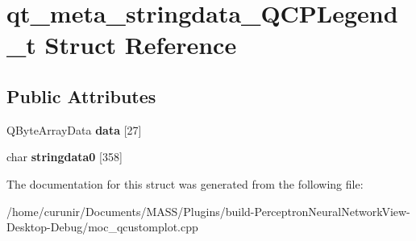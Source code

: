 \hypertarget{structqt__meta__stringdata___q_c_p_legend__t}{}\section{qt\+\_\+meta\+\_\+stringdata\+\_\+\+Q\+C\+P\+Legend\+\_\+t Struct Reference}
\label{structqt__meta__stringdata___q_c_p_legend__t}
\subsection*{Public Attributes}
\begin{DoxyCompactItemize}
\item 
Q\+Byte\+Array\+Data {\bfseries data} \mbox{[}27\mbox{]}\hypertarget{structqt__meta__stringdata___q_c_p_legend__t_ad8e758839b2e9818ac5f23a303aa99e7}{}\label{structqt__meta__stringdata___q_c_p_legend__t_ad8e758839b2e9818ac5f23a303aa99e7}

\item 
char {\bfseries stringdata0} \mbox{[}358\mbox{]}\hypertarget{structqt__meta__stringdata___q_c_p_legend__t_ad3fb75c2831542ab8fdf3b1e50696a64}{}\label{structqt__meta__stringdata___q_c_p_legend__t_ad3fb75c2831542ab8fdf3b1e50696a64}

\end{DoxyCompactItemize}


The documentation for this struct was generated from the following file\+:\begin{DoxyCompactItemize}
\item 
/home/curunir/\+Documents/\+M\+A\+S\+S/\+Plugins/build-\/\+Perceptron\+Neural\+Network\+View-\/\+Desktop-\/\+Debug/moc\+\_\+qcustomplot.\+cpp\end{DoxyCompactItemize}

